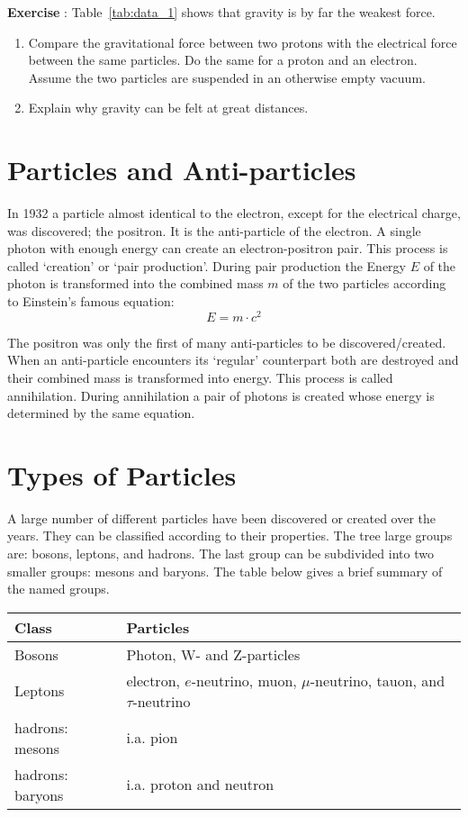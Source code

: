 \begin{shaded}
\textbf{Exercise \theExercise {}} : Table~\ref{tab:data_1} shows that gravity is by far the weakest force.
\begin{enumerate}[-]
\item Compare the gravitational force between two protons with the electrical force between the same particles. Do the same for a proton and an electron. Assume the two particles are suspended in an otherwise empty vacuum.
\item Explain why gravity can be felt at great distances.
\end{enumerate}\end{shaded}

\section{Particles and Anti-particles}
In 1932 a particle almost identical to the electron, except for the electrical charge, was discovered; the positron. It is the anti-particle of the electron. A single photon with enough energy can create an electron-positron pair. This process is called `creation' or `pair production'. During pair production the Energy $E$ of the photon is transformed into the combined mass $m$ of the two particles according to Einstein's famous equation:
\begin{equation}
E=m \cdot c^2
\end{equation}

The positron was only the first of many anti-particles to be discovered/created. When an anti-particle encounters its `regular' counterpart both are destroyed and their combined mass is transformed into energy. This process is called annihilation. During annihilation a pair of photons is created whose energy is determined by the same equation.

\section{Types of Particles}
A large number of different  particles have been discovered or created over the years. They can be classified according to their properties. The tree large groups are: bosons, leptons, and hadrons. The last group can be subdivided into two smaller groups: mesons and baryons. The table below gives a brief summary of the named groups.

\begin{center}\begin{tabular}[h] {l l}
Class & Particles \\ \hline
Bosons & Photon, W- and Z-particles \\
Leptons & electron, $e$-neutrino, muon, $\mu$-neutrino, tauon, and $\tau$-neutrino \\
hadrons: mesons & i.a.  pion \\
hadrons: baryons & i.a. proton and neutron
\end{tabular}\end{center}
\label{tab:data_2}

